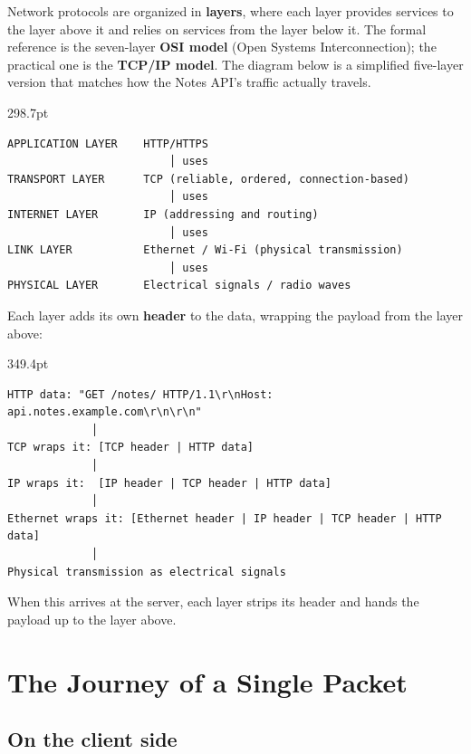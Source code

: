 Network protocols are organized in \textbf{layers}, where each layer provides services to the layer above it and relies on services from the layer below it. The formal reference is the seven-layer \textbf{OSI model} (Open Systems Interconnection); the practical one is the \textbf{TCP/IP model}. The diagram below is a simplified five-layer version that matches how the Notes API's traffic actually travels.

\begin{diagrambox}[short]{298.7pt}
\begin{Verbatim}[fontsize=\fontsize{9.0}{8.55}\selectfont]
APPLICATION LAYER    HTTP/HTTPS
                         │ uses
TRANSPORT LAYER      TCP (reliable, ordered, connection-based)
                         │ uses
INTERNET LAYER       IP (addressing and routing)
                         │ uses
LINK LAYER           Ethernet / Wi-Fi (physical transmission)
                         │ uses
PHYSICAL LAYER       Electrical signals / radio waves
\end{Verbatim}
\end{diagrambox}

\noindent{}Each layer adds its own \textbf{header} to the data, wrapping the payload from the layer above:

\begin{diagrambox}[short]{349.4pt}
\begin{Verbatim}[fontsize=\fontsize{9.0}{8.55}\selectfont]
HTTP data: "GET /notes/ HTTP/1.1\r\nHost: api.notes.example.com\r\n\r\n"
             │
TCP wraps it: [TCP header | HTTP data]
             │
IP wraps it:  [IP header | TCP header | HTTP data]
             │
Ethernet wraps it: [Ethernet header | IP header | TCP header | HTTP data]
             │
Physical transmission as electrical signals
\end{Verbatim}
\end{diagrambox}

\noindent{}When this arrives at the server, each layer strips its header and hands the payload up to the layer above.

\setcounter{section}{1}
\section{The Journey of a Single Packet}\label{26-network-stack-flow:262-the-journey-of-a-single-packet}

\subsection*{On the client side}\label{26-network-stack-flow:on-the-client-side}

